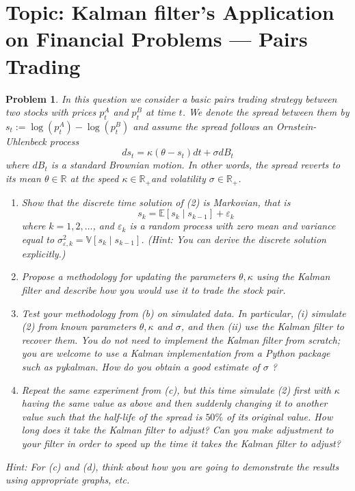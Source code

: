 \documentclass[11pt]{article}
\theoremstyle{plain} %
\newtheorem{problem}[theorem]{Problem}
\theoremstyle{remark}
\begin{document}
\section{Topic: Kalman filter's Application on Financial Problems --- Pairs Trading}
\begin{problem}
In this question we consider a basic pairs trading strategy between two stocks
with prices $p_t^A$ and $p_t^B$ at time $t$. We denote the spread between them
by $s_t:=\log \left(p_t^A\right)-\log \left(p_t^B\right)$ and assume the spread
follows an Ornstein-Uhlenbeck process
$$
  d s_t=\kappa\left(\theta-s_t\right) d t+\sigma d B_t
$$
where $d B_t$ is a standard Brownian motion. In other words, the spread reverts
to its mean $\theta \in \mathbb{R}$ at the speed $\kappa \in \mathbb{R}_{+}$and
volatility $\sigma \in \mathbb{R}_{+}$.
\begin{enumerate}[label=(\alph*)]
  \item Show that the discrete time solution of (2) is Markovian, that is
        $$
          s_k=\mathbb{E}\left[s_k \mid s_{k-1}\right]+\varepsilon_k
        $$
        where $k=1,2, \ldots$, and $\varepsilon_k$ is a random process with zero
        mean and variance equal to $\sigma_{\varepsilon,
            k}^2=\mathbb{V}\left[s_k \mid s_{k-1}\right]$. (Hint: You can derive the
        discrete solution explicitly.)
  \item Propose a methodology for updating the parameters $\theta, \kappa$ using
        the Kalman filter and describe how you would use it to trade the stock pair.
  \item Test your methodology from (b) on simulated data. In particular, (i)
        simulate (2) from known parameters $\theta, \kappa$ and $\sigma$, and then
        (ii) use the Kalman filter to recover them. You do not need to implement the
        Kalman filter from scratch; you are welcome to use a Kalman implementation
        from a Python package such as pykalman. How do you obtain a good estimate of
        $\sigma$ ?
  \item Repeat the same experiment from (c), but this time simulate (2) first
        with $\kappa$ having the same value as above and then suddenly changing it to
        another value such that the half-life of the spread is $50 \%$ of its original
        value. How long does it take the Kalman filter to adjust? Can you make
        adjustment to your filter in order to speed up the time it takes the Kalman
        filter to adjust?
\end{enumerate}
Hint: For (c) and (d), think about how you are going to demonstrate the results
using appropriate graphs, etc.
\end{problem}
\end{document}
